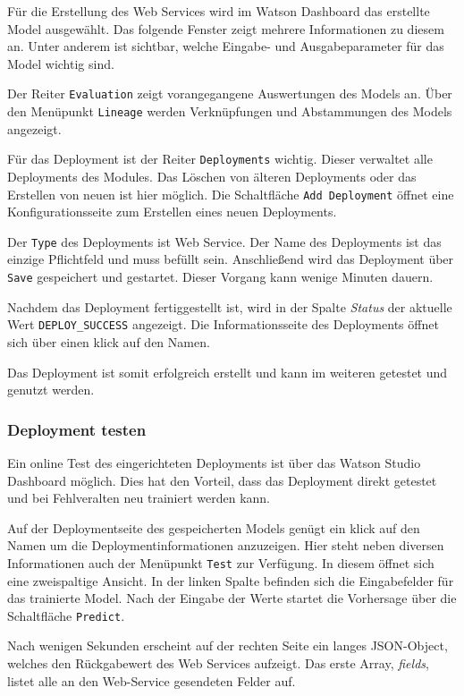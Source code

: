 Für die Erstellung des Web Services wird im Watson Dashboard das erstellte Model ausgewählt. Das folgende Fenster
zeigt mehrere Informationen zu diesem an. Unter anderem ist sichtbar, welche Eingabe- und Ausgabeparameter für das Model
wichtig sind.

Der Reiter  \texttt{Evaluation} zeigt vorangegangene Auswertungen des Models an. Über den Menüpunkt \texttt{Lineage}
werden Verknüpfungen und Abstammungen des Models angezeigt.

Für das Deployment ist der Reiter \texttt{Deployments} wichtig. Dieser verwaltet alle Deployments des Modules. Das Löschen
von älteren Deployments oder das Erstellen von neuen ist hier möglich. Die Schaltfläche \texttt{Add Deployment} öffnet
eine Konfigurationsseite zum Erstellen eines neuen Deployments.

Der \texttt{Type} des Deployments ist Web Service. Der Name des Deployments ist das einzige Pflichtfeld und muss befüllt
sein. Anschließend wird das Deployment über \texttt{Save} gespeichert und gestartet. Dieser Vorgang kann wenige Minuten
dauern.

Nachdem das Deployment fertiggestellt ist, wird in der Spalte \textit{Status} der aktuelle Wert \texttt{DEPLOY\_SUCCESS}
angezeigt. Die Informationsseite des Deployments öffnet sich über einen klick auf den Namen.

Das Deployment ist somit erfolgreich erstellt und kann im weiteren getestet und genutzt werden.

\subsubsection{Deployment testen}
Ein online Test des eingerichteten Deployments ist über das Watson Studio Dashboard möglich. Dies hat den Vorteil, dass
das Deployment direkt getestet und bei Fehlveralten neu trainiert werden kann.

Auf der Deploymentseite des gespeicherten Models genügt ein klick auf den Namen um die Deploymentinformationen anzuzeigen.
Hier steht neben diversen Informationen auch der Menüpunkt \texttt{Test} zur Verfügung. In diesem öffnet sich eine
zweispaltige Ansicht. In der linken Spalte befinden sich die Eingabefelder für das trainierte Model. Nach der Eingabe
der Werte startet die Vorhersage über die Schaltfläche \texttt{Predict}.

Nach wenigen Sekunden erscheint auf der rechten Seite ein langes JSON-Object, welches den Rückgabewert des Web Services
aufzeigt. Das erste Array, \textit{fields}, listet alle an den Web-Service gesendeten Felder auf.

